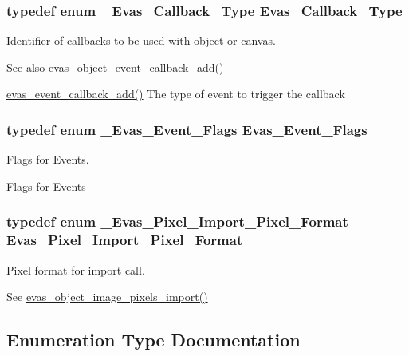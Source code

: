 \subsubsection[{Evas\_\-Callback\_\-Type}]{\setlength{\rightskip}{0pt plus 5cm}typedef enum {\bf \_\-Evas\_\-Callback\_\-Type}  {\bf Evas\_\-Callback\_\-Type}}\label{Evas_8h_a076b2a9b2de2b2144a4193b1d12ed448}


Identifier of callbacks to be used with object or canvas. 

\begin{DoxySeeAlso}{See also}
\hyperlink{group__Evas__Object__Group__Events_ga0147a80fc21895dc40165f208ec8cf55}{evas\_\-object\_\-event\_\-callback\_\-add()} 

\hyperlink{group__Evas__Canvas__Events_ga0388995a80e8951a532fbdc63ba26c71}{evas\_\-event\_\-callback\_\-add()} The type of event to trigger the callback 
\end{DoxySeeAlso}
\subsubsection[{Evas\_\-Event\_\-Flags}]{\setlength{\rightskip}{0pt plus 5cm}typedef enum {\bf \_\-Evas\_\-Event\_\-Flags}  {\bf Evas\_\-Event\_\-Flags}}\label{Evas_8h_a9fda4d6d744ae16549b3765df7363f95}


Flags for Events. 

Flags for Events 
\subsubsection[{Evas\_\-Pixel\_\-Import\_\-Pixel\_\-Format}]{\setlength{\rightskip}{0pt plus 5cm}typedef enum {\bf \_\-Evas\_\-Pixel\_\-Import\_\-Pixel\_\-Format}  {\bf Evas\_\-Pixel\_\-Import\_\-Pixel\_\-Format}}\label{Evas_8h_ae609d856d391e1d65968a137313e0eb7}


Pixel format for import call. 

See \hyperlink{group__Evas__Object__Image_gad87ced373138180afff4756fded5a4f3}{evas\_\-object\_\-image\_\-pixels\_\-import()} 

\subsection{Enumeration Type Documentation}
